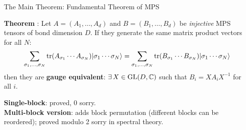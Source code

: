 \documentclass[aspectratio=169,10pt]{beamer}
\begin{document}
\begin{frame}{The Main Theorem: Fundamental Theorem of MPS}
    \vspace{-0.5em}

    \textbf{Theorem} \cite{Perez-Garcia2007Matrix}:
    {\small Let $A = (A_1,\ldots,A_d)$ and $B = (B_1,\ldots,B_d)$ be \emph{injective}
    MPS tensors of bond dimension $D$.
    If they generate the same matrix product vectors for all $N$:}
    \[
        \sum_{\sigma_1,\ldots,\sigma_N} \mathrm{tr}(A_{\sigma_1}\cdots A_{\sigma_N})
        |\sigma_1\cdots\sigma_N\rangle
        = 
        \sum_{\sigma_1,\ldots,\sigma_N} \mathrm{tr}(B_{\sigma_1}\cdots B_{\sigma_N})
        |\sigma_1\cdots\sigma_N\rangle
    \]
    {\small then they are \textbf{gauge equivalent}: $\exists\, X \in \mathrm{GL}(D,\mathbb{C})$
    such that $B_i = X A_i X^{-1}$ for all $i$.}

    \vspace{0.3em}
    \textbf{\textcolor{leangreen}{Single-block}}: proved, 0 sorry.\\
    \textbf{\textcolor{amber}{Multi-block version}}: adds block permutation
    (different blocks can be reordered); proved modulo 2 sorry in spectral theory.

    \vspace{0.3em}
    \begin{center}
    \end{center}
\end{frame}
\end{document}
